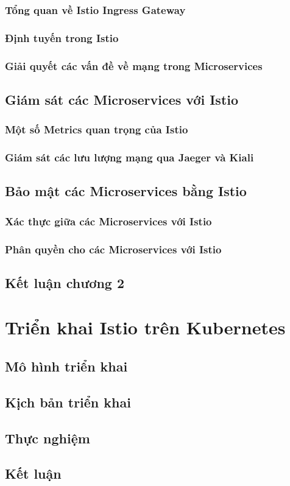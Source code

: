 \documentclass[12pt,a4paper]{report}
\begin{document}
			\subsection{Tổng quan về Istio Ingress Gateway}
			\subsection{Định tuyến trong Istio}
			\subsection{Giải quyết các vấn đề về mạng trong Microservices}
		\section{Giám sát các Microservices với Istio}
			\subsection{Một số Metrics quan trọng của Istio}
			\subsection{Giám sát các lưu lượng mạng qua Jaeger và Kiali}
		\section{Bảo mật các Microservices bằng Istio}
			\subsection{Xác thực giữa các Microservices với Istio}
			\subsection{Phân quyền cho các Microservices với Istio}
		\section*{Kết luận chương 2}
	\chapter{Triển khai Istio trên Kubernetes}
		\section{Mô hình triển khai}
		\section{Kịch bản triển khai}
		\section{Thực nghiệm}
		\section{Kết luận}
	
\end{document}
